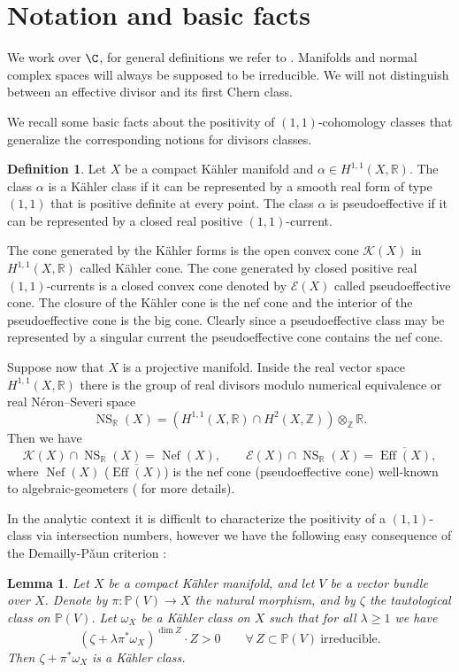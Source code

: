 \documentclass[JEP,XML,SOM,Unicode,NoEqCountersInSection,published]{cedram}
\let\mathcal\mathscr
\theoremstyle{plain}
\newtheorem{lemma}[theorem]{Lemma}
\theoremstyle{definition}
\newtheorem{definition}[theorem]{Definition}
\newcommand{\R}{\ensuremath{\mathbb{R}}}
\newcommand{\Z}{\ensuremath{\mathbb{Z}}}
\newcommand{\PP}{\ensuremath{\mathbb{P}}}
\newcommand{\holom}[3]{\ensuremath{#1:#2\to #3}}
\DeclareMathOperator{\Eff}{Eff}
\DeclareMathOperator{\Nef}{Nef}
\DeclareMathOperator{\NS}{NS}
\begin{document}
\section{Notation and basic facts}

We work over $\C$, for general definitions we refer to \cite{Har77, Dem12}.
Manifolds and normal complex spaces will always be supposed to be irreducible.
We will not distinguish between an effective divisor and its first Chern class.

We recall some basic facts about the positivity of $(1,1)$-cohomology classes that generalize
the corresponding notions for divisors classes.

\begin{definition}
Let $X$ be a compact Kähler manifold and $\alpha\in H^{1,1}(X, \R)$. The class $\alpha$ is a Kähler class if it can be represented by a smooth real form of type $(1,1)$ that is positive definite at every point. The class $\alpha$ is pseudoeffective if it can be represented by a closed real positive $(1,1)$-current.
\end{definition}

The cone generated by the Kähler forms is the open convex cone $\mathcal{K}(X)$ in $H^{1,1}(X, \R)$ called Kähler cone. The cone generated by closed positive real $(1,1)$-currents is a closed convex cone denoted by $\mathcal{E}(X)$ called pseudoeffective cone. The closure of the Kähler cone is the nef cone and the interior of the pseudoeffective cone is the big cone. Clearly since a pseudoeffective class may be represented by a singular current the pseudoeffective cone contains the nef cone.

Suppose now that $X$ is a projective manifold. Inside the real vector space $H^{1,1}(X, \R)$ there is the group of real divisors modulo numerical equivalence or real Néron--Severi space
\[
\NS_\R(X)=\left( H^{1,1}(X, \R)\cap H^2(X,\Z) \right)\otimes_\Z \R.
\]
Then we have
\[
\mathcal{K}(X)\cap \NS_\R(X) = \Nef(X),
\qquad
\mathcal{E}(X)\cap \NS_\R(X) = \overline{\Eff(X)},
\]
where $\Nef(X)$ (\resp $\overline{\Eff(X)}$) is the nef cone (\resp pseudoeffective
cone) well-known to algebraic-geometers (\cf \cite{BDPP13} for more details).

In the analytic context it is difficult to characterize the positivity of a $(1,1)$-class via intersection numbers,
however we have the following easy consequence of the Demailly-P\v aun criterion \cite[Th.\,0.1]{DP04}:

\begin{lemma} \label{lemmaconnected}
Let $X$ be a compact Kähler manifold, and let $V$ be a vector bundle over $X$.
Denote by $\holom{\pi}{\PP(V)}{X}$ the natural morphism, and by
$\zeta$ the tautological class on $\PP(V)$. Let $\omega_X$ be a Kähler class on $X$ such that
for all $\lambda \geq 1$ we have
\[
(\zeta+ \lambda \pi^* \omega_X)^{\dim Z} \cdot Z >0 \qquad \forall\,Z \subset \PP(V) \ \mbox{irreducible}.
\]
Then $\zeta+ \pi^* \omega_X$ is a Kähler class.
\end{lemma}
\end{document}
